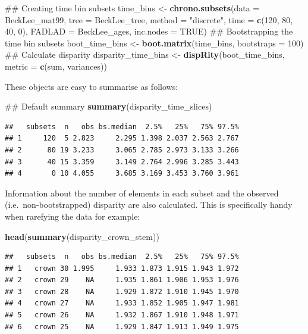 \documentclass[]{book}
\newenvironment{Shaded}{\begin{snugshade}}{\end{snugshade}}
\newcommand{\KeywordTok}[1]{\textcolor[rgb]{0.13,0.29,0.53}{\textbf{#1}}}
\newcommand{\DataTypeTok}[1]{\textcolor[rgb]{0.13,0.29,0.53}{#1}}
\newcommand{\DecValTok}[1]{\textcolor[rgb]{0.00,0.00,0.81}{#1}}
\newcommand{\StringTok}[1]{\textcolor[rgb]{0.31,0.60,0.02}{#1}}
\newcommand{\OtherTok}[1]{\textcolor[rgb]{0.56,0.35,0.01}{#1}}
\newcommand{\NormalTok}[1]{#1}
\theoremstyle{definition}
\theoremstyle{definition}
\theoremstyle{remark}
\begin{document}
\begin{Shaded}
\begin{Highlighting}[]
\NormalTok{## Creating time bin subsets}
\NormalTok{time_bins <-}\StringTok{ }\KeywordTok{chrono.subsets}\NormalTok{(}\DataTypeTok{data =}\NormalTok{ BeckLee_mat99, }\DataTypeTok{tree =}\NormalTok{ BeckLee_tree, }
    \DataTypeTok{method =} \StringTok{"discrete"}\NormalTok{, }\DataTypeTok{time =} \KeywordTok{c}\NormalTok{(}\DecValTok{120}\NormalTok{, }\DecValTok{80}\NormalTok{, }\DecValTok{40}\NormalTok{, }\DecValTok{0}\NormalTok{), }\DataTypeTok{FADLAD =}\NormalTok{ BeckLee_ages,}
    \DataTypeTok{inc.nodes =} \OtherTok{TRUE}\NormalTok{)}
\NormalTok{## Bootstrapping the time bin subsets}
\NormalTok{boot_time_bins <-}\StringTok{ }\KeywordTok{boot.matrix}\NormalTok{(time_bins, }\DataTypeTok{bootstraps =} \DecValTok{100}\NormalTok{)}
\NormalTok{## Calculate disparity}
\NormalTok{disparity_time_bins <-}\StringTok{ }\KeywordTok{dispRity}\NormalTok{(boot_time_bins, }\DataTypeTok{metric =} \KeywordTok{c}\NormalTok{(sum, variances))}
\end{Highlighting}
\end{Shaded}

These objects are easy to summarise as follows:

\begin{Shaded}
\begin{Highlighting}[]
\NormalTok{## Default summary}
\KeywordTok{summary}\NormalTok{(disparity_time_slices)}
\end{Highlighting}
\end{Shaded}

\begin{verbatim}
##   subsets  n   obs bs.median  2.5%   25%   75% 97.5%
## 1     120  5 2.823     2.295 1.398 2.037 2.563 2.767
## 2      80 19 3.233     3.065 2.785 2.973 3.133 3.266
## 3      40 15 3.359     3.149 2.764 2.996 3.285 3.443
## 4       0 10 4.055     3.685 3.169 3.453 3.760 3.961
\end{verbatim}

Information about the number of elements in each subset and the observed
(i.e.~non-bootstrapped) disparity are also calculated. This is
specifically handy when rarefying the data for example:

\begin{Shaded}
\begin{Highlighting}[]
\KeywordTok{head}\NormalTok{(}\KeywordTok{summary}\NormalTok{(disparity_crown_stem))}
\end{Highlighting}
\end{Shaded}

\begin{verbatim}
##   subsets  n   obs bs.median  2.5%   25%   75% 97.5%
## 1   crown 30 1.995     1.933 1.873 1.915 1.943 1.972
## 2   crown 29    NA     1.935 1.861 1.906 1.953 1.976
## 3   crown 28    NA     1.929 1.872 1.910 1.945 1.970
## 4   crown 27    NA     1.933 1.852 1.905 1.947 1.981
## 5   crown 26    NA     1.932 1.867 1.910 1.948 1.971
## 6   crown 25    NA     1.929 1.847 1.913 1.949 1.975
\end{verbatim}
\end{document}
